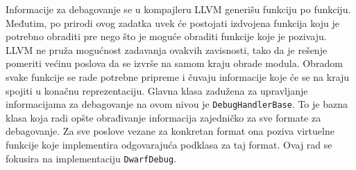 \documentclass[12pt,oneside]{memoir}
\begin{document}
Informacije za debagovanje se u kompajleru LLVM generišu funkciju po funkciju.
Međutim, po prirodi ovog zadatka uvek će postojati izdvojena funkcija koju je potrebno obraditi pre nego što je moguće obraditi funkcije koje je pozivaju.
LLVM ne pruža mogućnost zadavanja ovakvih zavisnosti, tako da je rešenje pomeriti većinu poslova da se izvrše na samom kraju obrade modula.
Obradom svake funkcije se rade potrebne pripreme i čuvaju informacije koje će se na kraju spojiti u konačnu reprezentaciju.
Glavna klasa zadužena za upravljanje informacijama za debagovanje na ovom nivou je \verb|DebugHandlerBase|.
To je bazna klasa koja radi opšte obrađivanje informacija zajedničko za sve formate za debagovanje.
Za sve poslove vezane za konkretan format ona poziva virtuelne funkcije koje implementira odgovarajuća podklasa za taj format.
Ovaj rad se fokusira na implementaciju \verb|DwarfDebug|.
\end{document}
